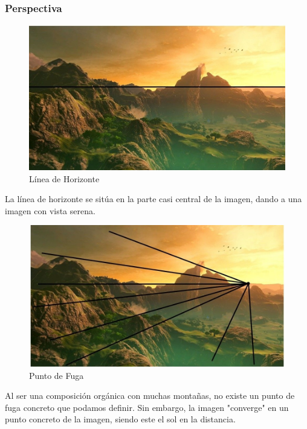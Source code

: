\documentclass[12pt]{article}
\begin{document}
        \subsubsection{Perspectiva}
          \begin{figure}[H]
            \centering
            \includegraphics[scale = 0.5]{Jesus/Seccion16/Fondo4.JPEG}
            \caption{Línea de Horizonte}
          \end{figure}
          La línea de horizonte se sitúa en la parte casi central de la imagen, dando a una imagen con vista serena.

          \begin{figure}[H]
            \centering
            \includegraphics[scale = 0.45]{Jesus/Seccion16/Fondo1.JPEG}
            \caption{Punto de Fuga}
          \end{figure}
          Al ser una composición orgánica con muchas montañas, no existe un punto de fuga concreto que podamos definir. Sin embargo, la imagen "converge" en un punto concreto de la imagen, siendo este el sol en la distancia. 
\end{document}
